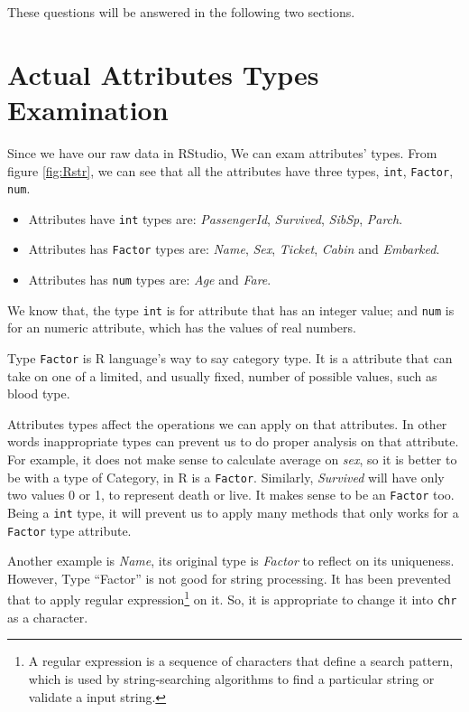 \documentclass[
]{book}
\begin{document}
These questions will be answered in the following two sections.

\hypertarget{actual-attributes-types-examination}{%
\section{Actual Attributes Types Examination}\label{actual-attributes-types-examination}}

Since we have our raw data in RStudio, We can exam attributes' types. From figure \ref{fig:Rstr}, we can see that all the attributes have three types, \texttt{int}, \texttt{Factor}, \texttt{num}.

\begin{itemize}
\item
  Attributes have \texttt{int} types are: \emph{PassengerId}, \emph{Survived}, \emph{SibSp}, \emph{Parch}.
\item
  Attributes has \texttt{Factor} types are: \emph{Name}, \emph{Sex}, \emph{Ticket}, \emph{Cabin} and \emph{Embarked}.
\item
  Attributes has \texttt{num} types are: \emph{Age} and \emph{Fare}.
\end{itemize}

We know that, the type \texttt{int} is for attribute that has an integer value; and \texttt{num} is for an numeric attribute, which has the values of real numbers.

Type \texttt{Factor} is R language's way to say category type. It is a attribute that can take on one of a limited, and usually fixed, number of possible values, such as blood type.

Attributes types affect the operations we can apply on that attributes. In other words inappropriate types can prevent us to do proper analysis on that attribute. For example, it does not make sense to calculate average on \emph{sex}, so it is better to be with a type of Category, in R is a \texttt{Factor}. Similarly, \emph{Survived} will have only two values 0 or 1, to represent death or live. It makes sense to be an \texttt{Factor} too. Being a \texttt{int} type, it will prevent us to apply many methods that only works for a \texttt{Factor} type attribute.

Another example is \emph{Name}, its original type is \emph{Factor} to reflect on its uniqueness. However, Type ``Factor'' is not good for string processing. It has been prevented that to apply regular expression\footnote{A regular expression is a sequence of characters that define a search pattern, which is used by string-searching algorithms to find a particular string or validate a input string.} on it. So, it is appropriate to change it into \texttt{chr} as a character.
\end{document}
